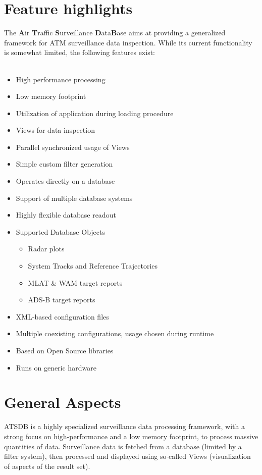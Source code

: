 \documentclass[10pt,letterpaper,extrafontsizes]{memoir}
\begin{document}
\section{Feature highlights}

The \textbf{A}ir \textbf{T}raffic \textbf{S}urveillance \textbf{D}ata\textbf{B}ase aims at providing a generalized framework for ATM surveillance data inspection. While its current functionality is somewhat limited, the following features exist:\\\\

\begin{itemize}  
\item High performance processing
\item Low memory footprint
\item Utilization of application during loading procedure
\item Views for data inspection
\item Parallel synchronized usage of Views
\item Simple custom filter generation
\item Operates directly on a database
\item Support of multiple database systems
\item Highly flexible database readout
\item Supported Database Objects
\begin{itemize}  
\item Radar plots
\item System Tracks and Reference Trajectories
\item MLAT \& WAM target reports
\item ADS-B target reports
\end{itemize}
\item XML-based configuration files
\item Multiple coexisting configurations, usage chosen during runtime
\item Based on Open Source libraries
\item Runs on generic hardware
\end{itemize}

\section{General Aspects}
ATSDB is a highly specialized surveillance data processing framework, with a strong focus on high-performance and  a  low  memory  footprint,  to  process  massive  quantities  of  data.   Surveillance  data  is fetched from a database (limited by a filter system), then processed and displayed using so-called Views (visualization of aspects of the result set).\\\\
\end{document}
